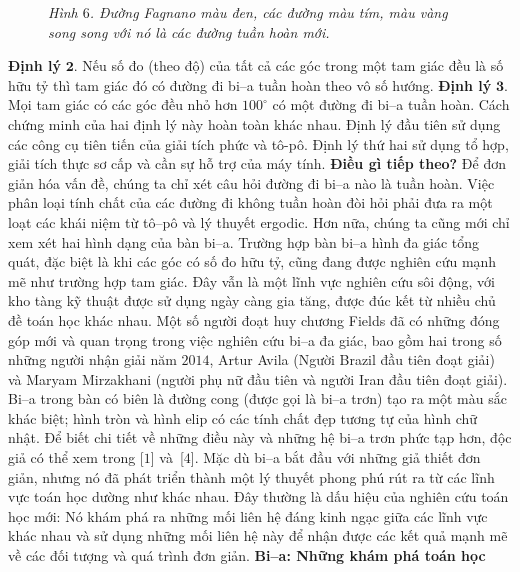 \begin{multicols}{2}
\begin{figure}[H]
		\caption{\small\textit{\color{duongvaotoanhoc}Hình $6$. Đường Fagnano màu đen, các đường màu tím, màu vàng song song với nó là các đường tuần hoàn mới.}}
		\vspace*{-10pt}
	\end{figure}
	{\bf\color{duongvaotoanhoc} Định lý} $\pmb{2.}$ Nếu số đo (theo độ) của tất cả các góc trong một tam giác đều là  số hữu tỷ thì tam giác đó có đường đi bi--a tuần hoàn theo vô số hướng.
	\vskip 0.1cm
	{\bf\color{duongvaotoanhoc} Định lý} $\pmb{3.}$ Mọi tam giác có các góc đều nhỏ hơn $100^{\circ}$ có một đường đi bi--a tuần hoàn.
	\vskip 0.1cm
	Cách chứng minh của hai định lý này hoàn toàn khác nhau. Định lý đầu tiên sử dụng các công cụ tiên tiến của giải tích phức  và tô-pô. Định lý thứ hai sử dụng tổ hợp, giải tích thực sơ cấp và cần sự hỗ trợ của máy tính.
	\vskip 0.1cm
	{\bf\color{duongvaotoanhoc}Điều gì tiếp theo?}
	\vskip 0.1cm
	Để đơn giản hóa vấn đề, chúng ta chỉ xét câu hỏi đường đi bi--a nào là tuần hoàn. Việc phân loại tính chất của các đường đi không tuần hoàn đòi hỏi phải đưa ra một loạt các khái niệm từ tô--pô và lý thuyết ergodic.
	\vskip 0.1cm
	Hơn nữa, chúng ta cũng mới chỉ xem xét hai hình dạng của bàn bi--a. Trường hợp bàn \linebreak bi--a hình đa giác tổng quát, đặc biệt là khi các
	góc có số đo hữu tỷ, cũng đang được nghiên cứu mạnh mẽ như trường hợp tam giác. Đây vẫn là một lĩnh vực nghiên cứu sôi động,
	với kho tàng kỹ thuật được sử dụng ngày càng gia tăng, được đúc kết từ nhiều chủ đề toán học khác nhau.
	\vskip 0.1cm
	Một số người đoạt huy chương Fields đã có những đóng góp mới và quan trọng trong việc nghiên cứu bi--a đa giác, bao gồm hai trong số những người nhận giải năm $2014$, Artur Avila (Người Brazil đầu tiên đoạt giải) và Maryam Mirzakhani (người phụ nữ đầu tiên và người Iran đầu tiên đoạt giải).
	\vskip 0.1cm
	Bi--a trong bàn có biên là đường cong (được gọi là bi--a trơn) tạo ra một màu sắc khác biệt; hình tròn và hình elip có các tính chất đẹp tương tự của hình chữ nhật. Để biết chi tiết về những điều này và những hệ bi--a trơn phức tạp hơn, độc giả có thể xem trong [$1$] và~[$4$].
	\vskip 0.1cm
	Mặc dù bi--a bắt đầu với những giả thiết đơn giản, nhưng nó đã phát triển thành một lý thuyết phong phú rút ra từ các lĩnh vực toán học dường như khác nhau. Đây thường là dấu hiệu của nghiên cứu toán học mới: Nó khám phá ra những mối liên hệ đáng kinh ngạc giữa các lĩnh vực khác nhau và sử dụng những mối liên hệ này để nhận được các kết quả mạnh mẽ về các đối tượng và quá trình đơn giản.
	\vskip 0.1cm
	{\bf\color{duongvaotoanhoc} Bi--a: Những khám phá toán học}

\end{multicols}
